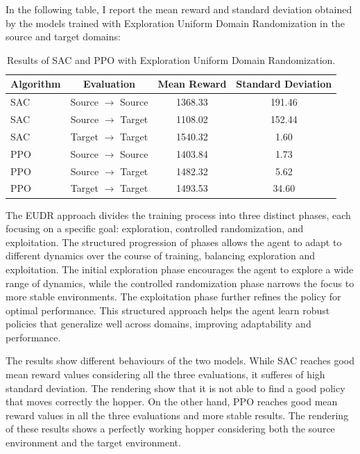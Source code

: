 \documentclass[11pt]{article}
\begin{document}
In the following table, I report the mean reward and standard deviation obtained by the models trained with Exploration Uniform Domain Randomization in the source and target domains:

\begin{table}[H]
    \centering
    \begin{tabular}{|l|c|c|c|}
        \hline
        \textbf{Algorithm} & \textbf{Evaluation} & \textbf{Mean Reward} & \textbf{Standard Deviation} \\ \hline
        SAC & Source $\rightarrow$ Source & 1368.33 & 191.46 \\ 
        SAC & Source $\rightarrow$ Target & 1108.02 & 152.44 \\ 
        SAC & Target $\rightarrow$ Target & 1540.32 & 1.60 \\ \hline
        PPO & Source $\rightarrow$ Source & 1403.84 & 1.73 \\ 
        PPO & Source $\rightarrow$ Target & 1482.32 & 5.62 \\ 
        PPO & Target $\rightarrow$ Target & 1493.53 & 34.60 \\ \hline
    \end{tabular}
    \caption{Results of SAC and PPO with Exploration Uniform Domain Randomization.}
    \label{tab:results_eudr}
\end{table}

The EUDR approach divides the training process into three distinct phases, each focusing on a specific goal: exploration, controlled randomization, and exploitation. The structured progression of phases allows the agent to adapt to different dynamics over the course of training, balancing exploration and exploitation. The initial exploration phase encourages the agent to explore a wide range of dynamics, while the controlled randomization phase narrows the focus to more stable environments. The exploitation phase further refines the policy for optimal performance. This structured approach helps the agent learn robust policies that generalize well across domains, improving adaptability and performance.

The results show different behaviours of the two models. While SAC reaches good mean reward values considering all the three evaluations, it sufferes of high standard deviation. The rendering show that it is not able to find a good policy that moves correctly the hopper. On the other hand, PPO reaches good mean reward values in all the three evaluations and more stable results. The rendering of these results shows a perfectly working hopper considering both the source environment and the target environment. 
\end{document}
